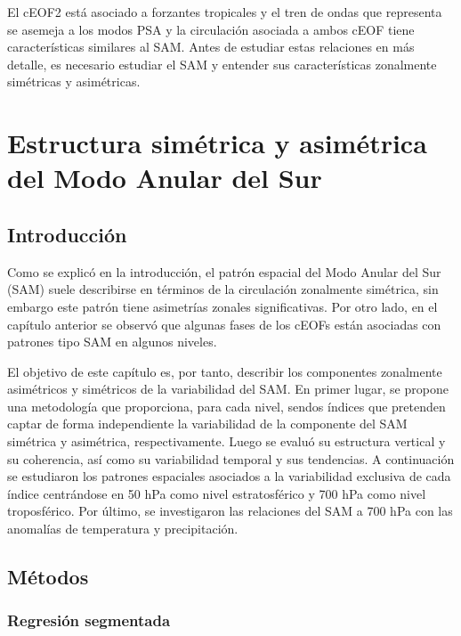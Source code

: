 \documentclass[12pt,oneside]{reedthesis}
\begin{document}
El cEOF2 está asociado a forzantes tropicales y el tren de ondas que representa se asemeja a los modos PSA y la circulación asociada a ambos cEOF tiene características similares al SAM.
Antes de estudiar estas relaciones en más detalle, es necesario estudiar el SAM y entender sus características zonalmente simétricas y asimétricas.

\hypertarget{asymsam}{%
\chapter{Estructura simétrica y asimétrica del Modo Anular del Sur}\label{asymsam}}

\hypertarget{introducciuxf3n-1}{%
\section{Introducción}\label{introducciuxf3n-1}}

Como se explicó en la introducción, el patrón espacial del Modo Anular del Sur (SAM) suele describirse en términos de la circulación zonalmente simétrica, sin embargo este patrón tiene asimetrías zonales significativas.
Por otro lado, en el capítulo anterior se observó que algunas fases de los cEOFs están asociadas con patrones tipo SAM en algunos niveles.

El objetivo de este capítulo es, por tanto, describir los componentes zonalmente asimétricos y simétricos de la variabilidad del SAM.
En primer lugar, se propone una metodología que proporciona, para cada nivel, sendos índices que pretenden captar de forma independiente la variabilidad de la componente del SAM simétrica y asimétrica, respectivamente.
Luego se evaluó su estructura vertical y su coherencia, así como su variabilidad temporal y sus tendencias.
A continuación se estudiaron los patrones espaciales asociados a la variabilidad exclusiva de cada índice centrándose en 50 hPa como nivel estratosférico y 700 hPa como nivel troposférico.
Por último, se investigaron las relaciones del SAM a 700 hPa con las anomalías de temperatura y precipitación.

\hypertarget{muxe9todos-3}{%
\section{Métodos}\label{muxe9todos-3}}

\hypertarget{regresiuxf3n-segmentada}{%
\subsection{Regresión segmentada}\label{regresiuxf3n-segmentada}}
\end{document}
